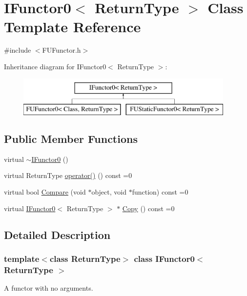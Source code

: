 \hypertarget{classIFunctor0}{
\section{IFunctor0$<$ ReturnType $>$ Class Template Reference}
\label{classIFunctor0}
}


{\ttfamily \#include $<$FUFunctor.h$>$}

Inheritance diagram for IFunctor0$<$ ReturnType $>$:\begin{figure}[H]
\begin{center}
\leavevmode
\includegraphics[height=2.000000cm]{classIFunctor0}
\end{center}
\end{figure}
\subsection*{Public Member Functions}
\begin{DoxyCompactItemize}
\item 
virtual \hyperlink{classIFunctor0_a02699e00c82067c5808fadf03d1d83e6}{$\sim$IFunctor0} ()
\item 
virtual ReturnType \hyperlink{classIFunctor0_adfceb968d959d54c212350ec3c6620cf}{operator()} () const =0
\item 
virtual bool \hyperlink{classIFunctor0_a879e46499999d08d3a8eadf2220178c6}{Compare} (void $\ast$object, void $\ast$function) const =0
\item 
virtual \hyperlink{classIFunctor0}{IFunctor0}$<$ ReturnType $>$ $\ast$ \hyperlink{classIFunctor0_a005f7b1b2ad7249e32be6944e035f3f7}{Copy} () const =0
\end{DoxyCompactItemize}


\subsection{Detailed Description}
\subsubsection*{template$<$class ReturnType$>$ class IFunctor0$<$ ReturnType $>$}

A functor with no arguments. 


